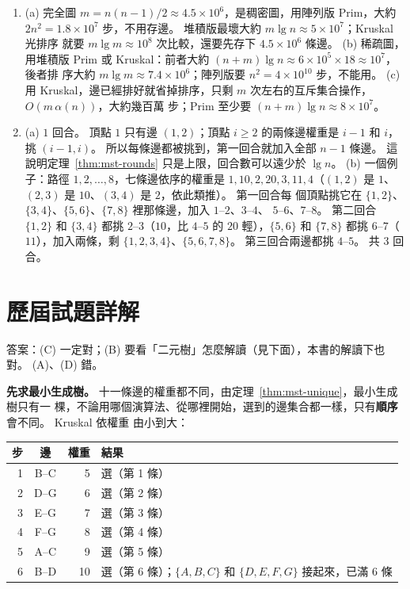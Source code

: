 \begin{enumerate}
\item (a) 完全圖 $m = n(n - 1)/2 \approx 4.5 \times 10^6$，是稠密圖，用陣列版 Prim，大約 $2n^2 =
1.8 \times 10^7$ 步，不用存邊。 堆積版最壞大約 $m \lg n \approx 5 \times 10^7$；Kruskal 光排序
就要 $m \lg m \approx 10^8$ 次比較，還要先存下 $4.5 \times 10^6$ 條邊。 (b) 稀疏圖，用堆積版
Prim 或 Kruskal：前者大約 $(n + m) \lg n \approx 6 \times 10^5 \times 18 \approx 10^7$，後者排
序大約 $m \lg m \approx 7.4 \times 10^6$；陣列版要 $n^2 = 4 \times 10^{10}$ 步，不能用。 (c) 用
Kruskal，邊已經排好就省掉排序，只剩 $m$ 次左右的互斥集合操作，$O(m\,\alpha(n))$，大約幾百萬
步；Prim 至少要 $(n + m) \lg n \approx 8 \times 10^7$。

\item (a) $1$ 回合。 頂點 $1$ 只有邊 $(1, 2)$；頂點 $i \ge 2$ 的兩條邊權重是 $i - 1$ 和 $i$，挑
$(i - 1, i)$。 所以每條邊都被挑到，第一回合就加入全部 $n - 1$ 條邊。 這說明定理~\ref{thm:mst-rounds}
只是上限，回合數可以遠少於 $\lg n$。 (b) 一個例子：路徑 $1, 2, \ldots, 8$，七條邊依序的權重是
$1, 10, 2, 20, 3, 11, 4$（$(1, 2)$ 是 $1$、$(2, 3)$ 是 $10$、$(3, 4)$ 是 $2$，依此類推）。 第一回合每
個頂點挑它在 $\{1, 2\}$、$\{3, 4\}$、$\{5, 6\}$、$\{7, 8\}$ 裡那條邊，加入 $1$--$2$、$3$--$4$、
$5$--$6$、$7$--$8$。 第二回合 $\{1, 2\}$ 和 $\{3, 4\}$ 都挑 $2$--$3$（$10$，比 $4$--$5$ 的 $20$
輕），$\{5, 6\}$ 和 $\{7, 8\}$ 都挑 $6$--$7$（$11$），加入兩條，剩 $\{1, 2, 3, 4\}$、$\{5, 6, 7,
8\}$。 第三回合兩邊都挑 $4$--$5$。 共 $3$ 回合。
\end{enumerate}

\section*{歷屆試題詳解}

答案：(C) 一定對；(B) 要看「二元樹」怎麼解讀（見下面），本書的解讀下也對。 (A)、(D) 錯。

\textbf{先求最小生成樹。} 十一條邊的權重都不同，由定理~\ref{thm:mst-unique}，最小生成樹只有一
棵，不論用哪個演算法、從哪裡開始，選到的邊集合都一樣，只有\textbf{順序}會不同。 Kruskal 依權重
由小到大：

\begin{center}
\small
\begin{tabular}{rcrl}
\toprule
步 & 邊 & 權重 & 結果 \\
\midrule
1 & B--C & 5 & 選（第 1 條） \\
2 & D--G & 6 & 選（第 2 條） \\
3 & E--G & 7 & 選（第 3 條） \\
4 & F--G & 8 & 選（第 4 條） \\
5 & A--C & 9 & 選（第 5 條） \\
6 & B--D & 10 & 選（第 6 條）；$\{A, B, C\}$ 和 $\{D, E, F, G\}$ 接起來，已滿 $6$ 條 \\
\bottomrule
\end{tabular}
\end{center}

